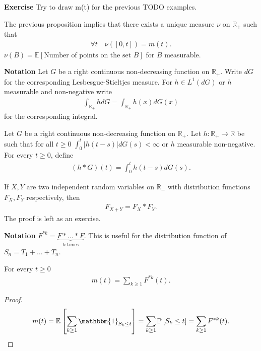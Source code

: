 \textbf{Exercise} Try to draw m(t) for the previous {\color{blue} TODO} examples.

\begin{rmk}[]
	The previous proposition implies that there exists a unique measure $\nu $ on $\mathbb{R}_+$ such that
	\begin{align}
		\forall t \quad \nu ([0,t]) = m(t).
	\end{align}
	$\nu(B)= \mathbb{E}_{} \left[ \textrm{Number of points on the set } B \right] $ for $B$ measurable.	
\end{rmk}
\noindent
\textbf{Notation} Let $G$ be a right continuous non-decreasing function on $\mathbb{R}_+$. Write $dG$ {\color{blue}for} the corresponding Lesbesgue-Stieltjes measure. For $h \in L^{1}(dG)$ or $h$ measurable and non-negative write
\begin{align}
	\int_{\mathbb{R}_+}^{} hdG = \int_{\mathbb{R}_+}^{} h(x)dG(x)
\end{align}
for the corresponding integral.

\begin{defn}
	Let $G$ be a right continuous non-decreasing function on $\mathbb{R}_+$. Let $h: \mathbb{R}_+ \to \mathbb{R}$ {\color{blue}be} such that for all $t\geq 0$ $\int_{0}^{t} |h(t-s)|dG(s) < \infty$ or $h$ measurable non-negative. For every $t\geq 0$, define
	\begin{align}
		(h*G)(t) = \int_{0}^{t} h(t-s)dG(s).
	\end{align}
\end{defn}

\begin{rmk}[]
	If $X, Y$ are two independent random variables on $\mathbb{R}_+$ with distribution functions $F_X, F_Y$ respectively, then
	\begin{align}
		F_{X+Y} = F_X * F_Y.
	\end{align}
The proof is left as an exercise.	
\end{rmk}
\noindent
\textbf{Notation} $F^{*k} = \underbrace{F* \ldots * F}_{k \textrm{ times}}$. This is useful for the distribution function of $S_n = T_1 + \ldots + T_n$.

\begin{prop}[]
	For every $t\geq 0$ 
	\begin{align}
		m(t) = \sum_{k\geq 1}^{} F^{*k}(t).
	\end{align}
\end{prop}
\begin{proof}
	\begin{align}
		m(t) = \mathbb{E}_{} \left[ \sum_{k\geq 1}^{} \mathbbm{1}_{S_k \leq t}  \right] = \sum_{k\geq 1}^{} \mathbb{P}_{} \left[ S_k \leq t \right] = \sum_{k\geq 1}^{} F^{*k}(t).
	\end{align}
\end{proof}

